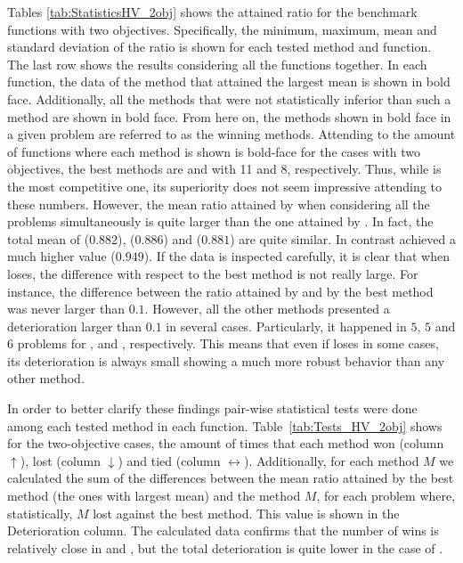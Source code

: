 Tables \ref{tab:StatisticsHV_2obj} shows the attained \HV{} ratio for the benchmark functions
with two objectives.
%
Specifically, the minimum, maximum, mean and standard deviation of the \HV{} ratio is shown for each tested method and function.
%
The last row shows the results considering all the functions together.
%
In each function, the data of the method that attained the largest mean is shown in bold face.
%
Additionally, all the methods that were not statistically inferior than such a method are shown in bold face.
%
From here on, the methods shown in bold face in a given problem are referred to as the winning methods.
%
Attending to the amount of functions where each method is shown is bold-face for the cases 
with two objectives, the best methods are \VSDMOEA{} and \RMOEA{} with 11 and 8, respectively.
%
Thus, while \VSDMOEA{} is the most competitive one, its superiority does not seem impressive
attending to these numbers.
%
However, the mean \HV{} ratio attained by \VSDMOEA{} when considering all the problems simultaneously is quite larger
than the one attained by \RMOEA{}.
%
In fact, the total mean of \RMOEA{} ($0.882$), \NSGAII{} ($0.886$) and \MOEAD{} ($0.881$) are quite similar.
%
In contrast \VSDMOEA{} achieved a much higher value ($0.949$).
%
If the data is inspected carefully, it is clear that when \VSDMOEA{} loses, the difference with respect to the
best method is not really large.
%
For instance, the difference between the \HV{} ratio attained by \VSDMOEA{} and by the best method was never larger
than $0.1$.
%
However, all the other methods presented a deterioration larger than $0.1$ in several cases.
%
Particularly, it happened in $5$, $5$ and $6$ problems for \RMOEA{}, \NSGAII{} and \MOEAD{}, respectively.
%
This means that even if \VSDMOEA{} loses in some cases, its deterioration is always small showing a much more 
robust behavior than any other method.




In order to better clarify these findings pair-wise statistical tests were done among each tested method in each
function.
%
Table~\ref{tab:Tests_HV_2obj} shows for the two-objective cases, the amount of times that each method won (column $\uparrow$),
lost (column $\downarrow$) and tied (column $\leftrightarrow$).
%
Additionally, for each method $M$ we calculated the sum of the differences between the mean \HV{} ratio attained by the best method (the ones with largest mean)
and the method $M$, for each problem where, statistically, $M$ lost against the best method.
%
This value is shown in the Deterioration column.
%
The calculated data confirms that the number of wins is relatively close in \VSDMOEA{} and \RMOEA{}, but the total deterioration is quite lower in the case of \VSDMOEA{}.


